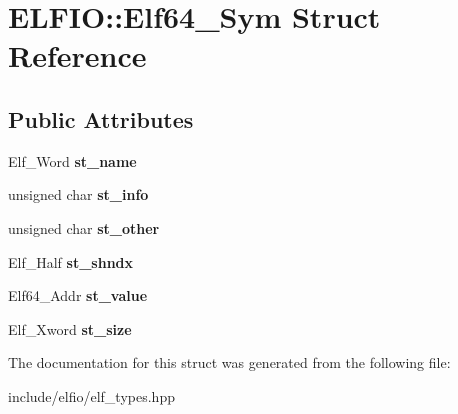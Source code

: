 \hypertarget{struct_e_l_f_i_o_1_1_elf64___sym}{}\section{E\+L\+F\+IO\+:\+:Elf64\+\_\+\+Sym Struct Reference}
\label{struct_e_l_f_i_o_1_1_elf64___sym}
\subsection*{Public Attributes}
\begin{DoxyCompactItemize}
\item 
Elf\+\_\+\+Word {\bfseries st\+\_\+name}\hypertarget{struct_e_l_f_i_o_1_1_elf64___sym_ac3e8ac42b6ea17a10b748e07b735806d}{}\label{struct_e_l_f_i_o_1_1_elf64___sym_ac3e8ac42b6ea17a10b748e07b735806d}

\item 
unsigned char {\bfseries st\+\_\+info}\hypertarget{struct_e_l_f_i_o_1_1_elf64___sym_a5d478b9dd37ee1b59b6c8a0635694458}{}\label{struct_e_l_f_i_o_1_1_elf64___sym_a5d478b9dd37ee1b59b6c8a0635694458}

\item 
unsigned char {\bfseries st\+\_\+other}\hypertarget{struct_e_l_f_i_o_1_1_elf64___sym_a5ef924d5c38e17e297deac7c107460a8}{}\label{struct_e_l_f_i_o_1_1_elf64___sym_a5ef924d5c38e17e297deac7c107460a8}

\item 
Elf\+\_\+\+Half {\bfseries st\+\_\+shndx}\hypertarget{struct_e_l_f_i_o_1_1_elf64___sym_a0d55bca13b83649e7b90f6071d4bcba5}{}\label{struct_e_l_f_i_o_1_1_elf64___sym_a0d55bca13b83649e7b90f6071d4bcba5}

\item 
Elf64\+\_\+\+Addr {\bfseries st\+\_\+value}\hypertarget{struct_e_l_f_i_o_1_1_elf64___sym_ad8e042a1818a63da03e6e2d0b6345283}{}\label{struct_e_l_f_i_o_1_1_elf64___sym_ad8e042a1818a63da03e6e2d0b6345283}

\item 
Elf\+\_\+\+Xword {\bfseries st\+\_\+size}\hypertarget{struct_e_l_f_i_o_1_1_elf64___sym_a2a9f2b48c0d96b49a51fd6758106e1ae}{}\label{struct_e_l_f_i_o_1_1_elf64___sym_a2a9f2b48c0d96b49a51fd6758106e1ae}

\end{DoxyCompactItemize}


The documentation for this struct was generated from the following file\+:\begin{DoxyCompactItemize}
\item 
include/elfio/elf\+\_\+types.\+hpp\end{DoxyCompactItemize}
